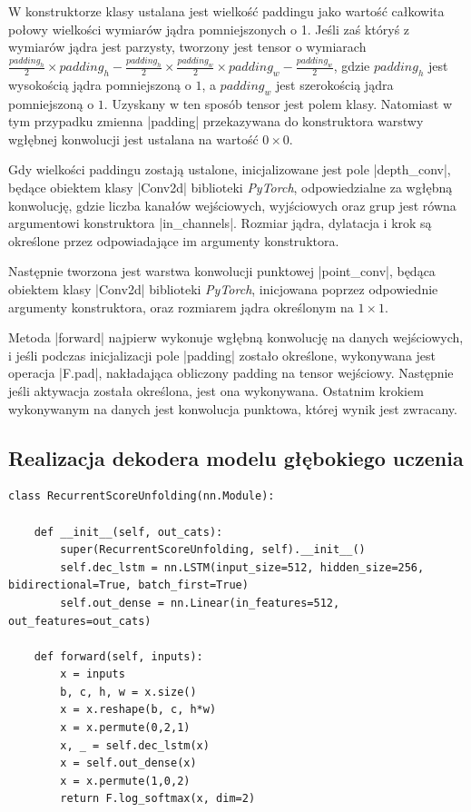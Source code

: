 W konstruktorze klasy ustalana jest wielkość paddingu jako wartość całkowita połowy wielkości wymiarów jądra pomniejszonych o 1. Jeśli zaś któryś z wymiarów jądra jest parzysty, tworzony jest tensor o wymiarach $\frac{padding_h}{2} \times padding_h - \frac{padding_h}{2} \times \frac{padding_w}{2} \times padding_w - \frac{padding_w}{2}$, gdzie $padding_h$ jest wysokością jądra pomniejszoną o $1$, a $padding_w$ jest szerokością jądra pomniejszoną o $1$. Uzyskany w ten sposób tensor jest polem klasy. Natomiast w tym przypadku zmienna \pyth|padding| przekazywana do konstruktora warstwy wgłębnej konwolucji jest ustalana na wartość $0 \times 0$.

Gdy wielkości paddingu zostają ustalone, inicjalizowane jest pole \pyth|depth_conv|, będące obiektem klasy \pyth|Conv2d| biblioteki \textit{PyTorch}, odpowiedzialne za wgłębną konwolucję, gdzie liczba kanałów wejściowych, wyjściowych oraz grup jest równa argumentowi konstruktora \pyth|in_channels|. Rozmiar jądra, dylatacja i krok są określone przez odpowiadające im argumenty konstruktora.

Następnie tworzona jest warstwa konwolucji punktowej \pyth|point_conv|, będąca obiektem klasy \pyth|Conv2d| biblioteki \textit{PyTorch}, inicjowana poprzez odpowiednie argumenty konstruktora, oraz rozmiarem jądra określonym na $1 \times 1$.

Metoda \pyth|forward| najpierw wykonuje wgłębną konwolucję na danych wejściowych, i jeśli podczas inicjalizacji pole \pyth|padding| zostało określone, wykonywana jest operacja \pyth|F.pad|, nakładająca obliczony padding na tensor wejściowy. Następnie jeśli aktywacja została określona, jest ona wykonywana. Ostatnim krokiem wykonywanym na danych jest konwolucja punktowa, której wynik jest zwracany.

\subsection{Realizacja dekodera modelu głębokiego uczenia} \label{Decoder}
\begin{lstlisting}[caption={\pyth|RecurrentScoreUnfolding| - klasa dekodera modelu głębokiego uczenia}, label={decoder}]
class RecurrentScoreUnfolding(nn.Module):

	def __init__(self, out_cats):
		super(RecurrentScoreUnfolding, self).__init__()
		self.dec_lstm = nn.LSTM(input_size=512, hidden_size=256, bidirectional=True, batch_first=True)
		self.out_dense = nn.Linear(in_features=512, out_features=out_cats)
	
	def forward(self, inputs):
		x = inputs
		b, c, h, w = x.size()
		x = x.reshape(b, c, h*w)
		x = x.permute(0,2,1)
		x, _ = self.dec_lstm(x)
		x = self.out_dense(x)
		x = x.permute(1,0,2)
		return F.log_softmax(x, dim=2)
\end{lstlisting}

